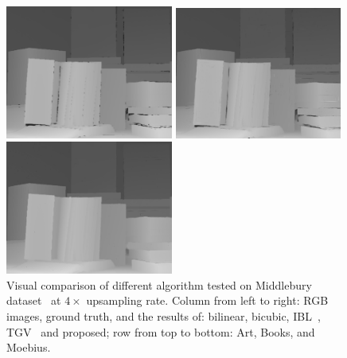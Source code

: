 \begin{figure}[t]
\begin{minipage}[b]{0.48\linewidth}
\end{minipage}
\hfill
\begin{minipage}[b]{0.48\linewidth}
  \centering
  \centerline{\includegraphics[width=5.5cm]{depth_interp/quan_nhf_books/yang.png}}
\end{minipage}
%
\hfill
\begin{minipage}[b]{0.48\linewidth}
  \centering
  \centerline{\includegraphics[width=5.5cm]{depth_interp/quan_nhf_books/tgv.png}}
\end{minipage}
%
\hfill
\begin{minipage}[b]{0.48\linewidth}
  \centering
  \centerline{\includegraphics[width=5.5cm]{depth_interp/quan_nhf_books/our.png}}
\end{minipage}
\vfill
\label{fig2:books}
\caption{Visual comparison of different algorithm tested on Middlebury dataset~\cite{scharstein2003high} at $4\times$ upsampling rate. Column from left to right: RGB images, ground truth, and the results of: bilinear, bicubic, IBL~\cite{yang2014color}, TGV~\cite{ferstl2013image} and proposed; row from top to bottom: Art, Books, and Moebius.}
\end{figure}
